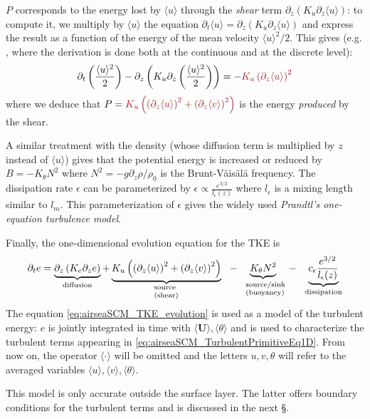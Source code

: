 $P$ corresponds to the energy lost by $\langle u \rangle$ through the
\textit{shear} term
$\partial_z \left(K_u \partial_z \langle u \rangle\right)$:
to compute it, we multiply by $\langle u \rangle$ the equation
$\partial_t \langle u \rangle = \partial_z (K_u \partial_z \langle u \rangle)$
and express the result as a function of the
energy of the mean velocity $\displaystyle\langle u \rangle^2/2$.
This gives (e.g. \citep{burchard_energy-conserving_2002},
where the derivation is done both at the continuous and at the
discrete level):
\begin{equation}
	\partial_t \left(\frac{\langle u \rangle^2}{2}\right)
	- \partial_z \left(K_u
	\partial_z\left(\frac{\langle u \rangle^2}{2}\right)\right)
	= - \emphase{K_u\left(\partial_z \langle u \rangle\right)^2}
\end{equation}
where we deduce that
$P=\emphase{K_u \left(\left(\partial_z \langle u \rangle\right)^2 +
\left(\partial_z \langle v \rangle\right)^2\right)}$ is the energy
\textit{produced} by the shear.
\par
A similar treatment with the density
(whose diffusion term is multiplied by $z$ instead of $\langle u \rangle$)
gives that the potential energy
is increased or reduced by $B = -K_\theta N^2$ where
$N^2 = - \displaystyle {g\partial_z \rho}/{\rho_0}$ is the Brunt-Väisälä
frequency.
The dissipation rate $\epsilon$ can be parameterized by
$\epsilon \propto \displaystyle \frac{e^{3/2}}{l_{\epsilon}(z)}$
where $l_\epsilon$ is a mixing length similar to $l_m$.
This parameterization of $\epsilon$ gives the widely used
\textit{Prandtl's one-equation turbulence model}.
\par
Finally, the one-dimensional evolution equation for the TKE is
\begin{equation}
\label{eq:airseaSCM_TKE_evolution}
    \begin{aligned}
    \partial_t e =
    \underbrace{\partial_z \left(K_e
    \partial_z e\right)}_{\text{diffusion}}
	    + \underbrace{K_u \left(\left(\partial_z
	    \langle u \rangle\right)^2 +
	    \left(\partial_z \langle v \rangle\right)^2\right)
	    }_{\parbox{25pt}{\scriptsize{ source\\(shear)}}}
    ~~-~~ \underbrace{K_{\theta} N^2
    }_{\parbox{35pt}{\scriptsize{ source/sink\\(buoyancy)}}}
    ~~-~~ \underbrace{c_{\epsilon}
    \frac{e^{3/2}}{l_{\epsilon}(z)}}_{\text{dissipation}}
    \end{aligned}
\end{equation}
The equation \eqref{eq:airseaSCM_TKE_evolution} is used as a model
of the turbulent energy: $e$ is jointly integrated in time with
$\langle \mathbf{U} \rangle, \langle \theta \rangle$
and is used to characterize the turbulent terms appearing
in \eqref{eq:airseaSCM_TurbulentPrimitiveEq1D}.
From now on, the operator $\langle \cdot \rangle$ will be omitted
and the letters $u, v, \theta$ will refer to the averaged variables
$\langle u \rangle, \langle v \rangle, \langle \theta \rangle$.
\par
This model is only accurate outside the surface layer. The latter
offers boundary conditions for the turbulent terms and is discussed
in the next \S.
